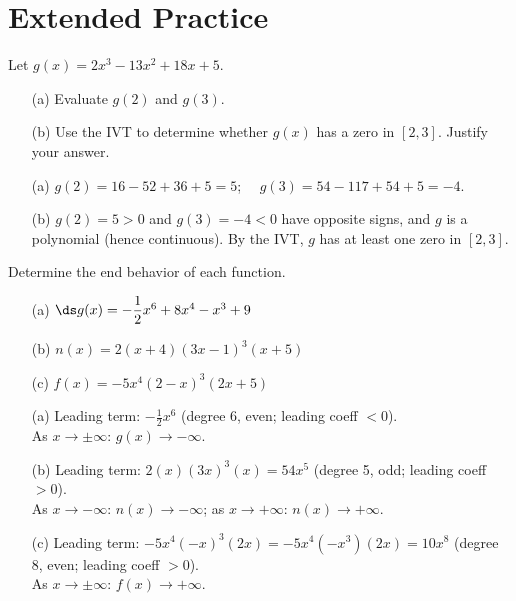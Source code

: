 \documentclass{ximera}
\begin{document}
\bigskip
\section*{Extended Practice}

\begin{problem}
Let $g(x) = 2x^3 - 13x^2 + 18x + 5$.
\begin{enumerate}
  \item[(a)] Evaluate $g(2)$ and $g(3)$.
  \medskip
  \item[(b)] Use the IVT to determine whether $g(x)$ has a zero in $[2,3]$. Justify your answer.
\end{enumerate}

\begin{solution}
\begin{enumerate}
  \item[(a)] $g(2) = 16-52+36+5 = 5$; $\quad g(3) = 54-117+54+5 = -4$.

  \item[(b)] $g(2)=5>0$ and $g(3)=-4<0$ have opposite signs, and $g$ is a polynomial (hence continuous). By the IVT, $g$ has at least one zero in $[2,3]$.
\end{enumerate}
\end{solution}
\end{problem}


\begin{problem}
Determine the end behavior of each function.
\begin{enumerate}
  \item[(a)] $\ds g(x) = -\dfrac{1}{2}x^6 + 8x^4 - x^3 + 9$
  \medskip
  \item[(b)] $n(x) = 2(x+4)(3x-1)^3(x+5)$
  \medskip
  \item[(c)] $f(x) = -5x^4(2-x)^3(2x+5)$
\end{enumerate}

\begin{solution}
\begin{enumerate}
  \item[(a)] Leading term: $-\frac{1}{2}x^6$ (degree 6, even; leading coeff $<0$).\\
  As $x\to\pm\infty$: $g(x)\to-\infty$.

  \item[(b)] Leading term: $2(x)(3x)^3(x) = 54x^5$ (degree 5, odd; leading coeff $>0$).\\
  As $x\to-\infty$: $n(x)\to-\infty$; as $x\to+\infty$: $n(x)\to+\infty$.

  \item[(c)] Leading term: $-5x^4(-x)^3(2x) = -5x^4(-x^3)(2x) = 10x^8$ (degree 8, even; leading coeff $>0$).\\
  As $x\to\pm\infty$: $f(x)\to+\infty$.
\end{enumerate}
\end{solution}
\end{problem}
\end{document}
